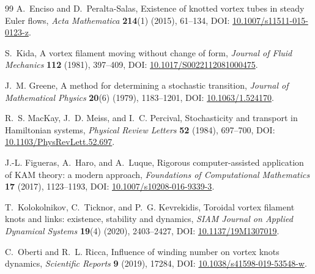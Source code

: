 \begin{thebibliography}{99}
A.~Enciso and D.~Peralta-Salas,
\newblock Existence of knotted vortex tubes in steady Euler flows,
\newblock \emph{Acta Mathematica} \textbf{214}(1) (2015), 61--134,
\newblock DOI: \href{https://doi.org/10.1007/s11511-015-0123-z}{10.1007/s11511-015-0123-z}.

S.~Kida,
\newblock A vortex filament moving without change of form,
\newblock \emph{Journal of Fluid Mechanics} \textbf{112} (1981), 397--409,
\newblock DOI: \href{https://doi.org/10.1017/S0022112081000475}{10.1017/S0022112081000475}.

J.~M. Greene,
\newblock A method for determining a stochastic transition,
\newblock \emph{Journal of Mathematical Physics} \textbf{20}(6) (1979), 1183--1201,
\newblock DOI: \href{https://doi.org/10.1063/1.524170}{10.1063/1.524170}.

R.~S. MacKay, J.~D. Meiss, and I.~C. Percival,
\newblock Stochasticity and transport in Hamiltonian systems,
\newblock \emph{Physical Review Letters} \textbf{52} (1984), 697--700,
\newblock DOI: \href{https://doi.org/10.1103/PhysRevLett.52.697}{10.1103/PhysRevLett.52.697}.

J.-L. Figueras, A.~Haro, and A.~Luque,
\newblock Rigorous computer-assisted application of KAM theory: a modern approach,
\newblock \emph{Foundations of Computational Mathematics} \textbf{17} (2017), 1123--1193,
\newblock DOI: \href{https://doi.org/10.1007/s10208-016-9339-3}{10.1007/s10208-016-9339-3}.

T.~Kolokolnikov, C.~Ticknor, and P.~G. Kevrekidis,
\newblock Toroidal vortex filament knots and links: existence, stability and dynamics,
\newblock \emph{SIAM Journal on Applied Dynamical Systems} \textbf{19}(4) (2020), 2403--2427,
\newblock DOI: \href{https://doi.org/10.1137/19M1307019}{10.1137/19M1307019}.

C.~Oberti and R.~L. Ricca,
\newblock Influence of winding number on vortex knots dynamics,
\newblock \emph{Scientific Reports} \textbf{9} (2019), 17284,
\newblock DOI: \href{https://doi.org/10.1038/s41598-019-53548-w}{10.1038/s41598-019-53548-w}.

\end{thebibliography}
\fi



